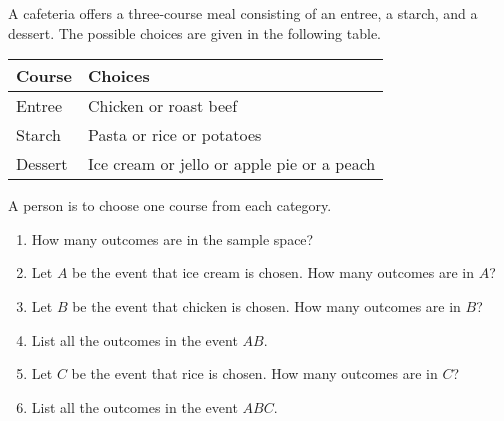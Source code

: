 \documentclass[fleqn, a4paper, 11pt, oneside]{amsart}
\theoremstyle{definition}
\theoremstyle{theorem}
\begin{document}
\begin{question}
	A cafeteria offers a three-course meal consisting of an entree, a starch, and a dessert.
	The possible choices are given in the following table.
	\begin{table}
		\centering
		\begin{tabular}{l l}
			\toprule
			Course & Choices\\
			\midrule
			Entree & Chicken or roast beef\\
			Starch & Pasta or rice or potatoes\\
			Dessert & Ice cream or jello or apple pie or a peach\\
			\bottomrule
		\end{tabular}
	\end{table}
	A person is to choose one course from each category.
	\begin{enumerate}
		\item
			How many outcomes are in the sample space?
		\item
			Let $A$ be the event that ice cream is chosen.
			How many outcomes are in $A$?
		\item
			Let $B$ be the event that chicken is chosen.
			How many outcomes are in $B$?
		\item
			List all the outcomes in the event $A B$.
		\item
			Let $C$ be the event that rice is chosen.
			How many outcomes are in $C$?
		\item
			List all the outcomes in the event $A B C$.
	\end{enumerate}
\end{question}
\end{document}
